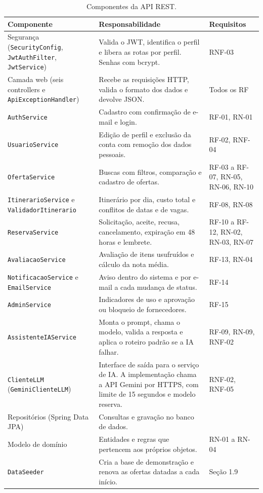 \documentclass[12pt,a4paper]{article}
\newcommand{\classe}[1]{\texttt{#1}}
\begin{document}
\begin{table}[H]
    \footnotesize
    \begin{tabularx}{\linewidth}{@{}p{4.4cm}Lp{3.1cm}@{}}
        \toprule
        \textbf{Componente} & \textbf{Responsabilidade} & \textbf{Requisitos} \\
        \midrule
        Segurança (\classe{SecurityConfig}, \classe{JwtAuthFilter}, \classe{JwtService}) & Valida o JWT, identifica o perfil e libera as rotas por perfil. Senhas com bcrypt. & RNF-03 \\
        Camada web (seis controllers e \classe{ApiExceptionHandler}) & Recebe as requisições HTTP, valida o formato dos dados e devolve JSON. & Todos os RF \\
        \classe{AuthService} & Cadastro com confirmação de e-mail e login. & RF-01, RN-01 \\
        \classe{UsuarioService} & Edição de perfil e exclusão da conta com remoção dos dados pessoais. & RF-02, RNF-04 \\
        \classe{OfertaService} & Buscas com filtros, comparação e cadastro de ofertas. & RF-03 a RF-07, RN-05, RN-06, RN-10 \\
        \classe{ItinerarioService} e \classe{ValidadorItinerario} & Itinerário por dia, custo total e conflitos de datas e de vagas. & RF-08, RN-08 \\
        \classe{ReservaService} & Solicitação, aceite, recusa, cancelamento, expiração em 48 horas e lembrete. & RF-10 a RF-12, RN-02, RN-03, RN-07 \\
        \classe{AvaliacaoService} & Avaliação de itens usufruídos e cálculo da nota média. & RF-13, RN-04 \\
        \classe{NotificacaoService} e \classe{EmailService} & Aviso dentro do sistema e por e-mail a cada mudança de status. & RF-14 \\
        \classe{AdminService} & Indicadores de uso e aprovação ou bloqueio de fornecedores. & RF-15 \\
        \classe{AssistenteIAService} & Monta o prompt, chama o modelo, valida a resposta e aplica o roteiro padrão se a IA falhar. & RF-09, RN-09, RNF-02 \\
        \classe{ClienteLLM} (\classe{GeminiClienteLLM}) & Interface de saída para o serviço de IA. A implementação chama a API Gemini por HTTPS, com limite de 15 segundos e modelo reserva. & RNF-02, RNF-05 \\
        Repositórios (Spring Data JPA) & Consultas e gravação no banco de dados. & \\
        Modelo de domínio & Entidades e regras que pertencem aos próprios objetos. & RN-01 a RN-04 \\
        \classe{DataSeeder} & Cria a base de demonstração e renova as ofertas datadas a cada início. & Seção 1.9 \\
        \bottomrule
    \end{tabularx}
    \caption{Componentes da API REST.}
\end{table}
\end{document}
